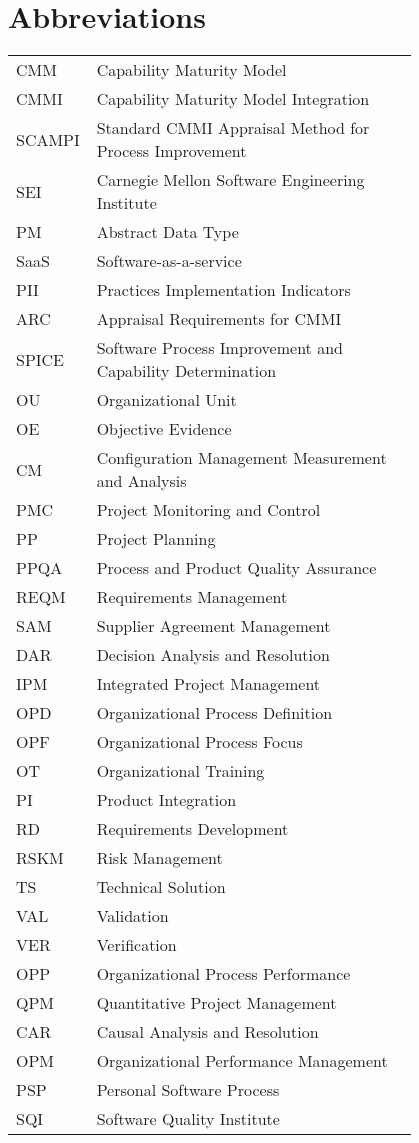 \chapter*{Abbreviations}

\begin{flushleft}
\begin{tabular}{l p{0.8\linewidth}}
CMM      & Capability Maturity Model\\
CMMI      & Capability Maturity Model Integration\\
SCAMPI      & Standard CMMI Appraisal Method for Process Improvement\\
SEI      & Carnegie Mellon Software Engineering Institute\\
PM      & Abstract Data Type\\
SaaS      & Software-as-a-service\\
PII      & Practices Implementation Indicators\\
ARC & Appraisal Requirements for CMMI\\
SPICE & Software Process Improvement and Capability Determination\\
OU & Organizational Unit\\
OE & Objective Evidence\\
CM & Configuration Management Measurement and Analysis\\
PMC & Project Monitoring and Control\\
PP & Project Planning\\
PPQA & Process and Product Quality Assurance\\
REQM & Requirements Management\\
SAM & Supplier Agreement Management\\
DAR & Decision Analysis and Resolution\\
IPM & Integrated Project Management\\
OPD & Organizational Process Definition\\
OPF & Organizational Process Focus\\
OT & Organizational Training\\
PI & Product Integration\\
RD & Requirements Development\\
RSKM & Risk Management\\
TS & Technical Solution\\
VAL & Validation\\
VER & Verification\\
OPP & Organizational Process Performance\\
QPM & Quantitative Project Management\\
CAR & Causal Analysis and Resolution\\
OPM & Organizational Performance Management\\
PSP & Personal Software Process\\
SQI & Software Quality Institute\\
\end{tabular}
\end{flushleft}

